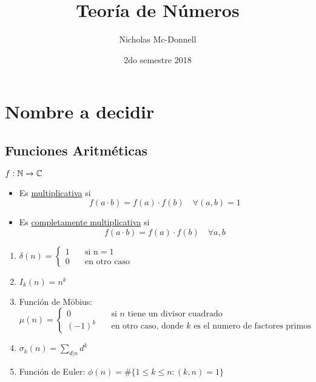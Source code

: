 

\title{Teoría de Números}
\author{Nicholas Mc-Donnell}
\date{2do semestre 2018}



\maketitle
\newpage

\tableofcontents

\newpage
\chapter{Nombre a decidir}
\section{Funciones Aritméticas}
\begin{defn}
	$f:\mathbb{N}\xrightarrow[]{}\mathbb{C}$
	\begin{itemize}
		\item Es \underline{multiplicativa} si
		      \[f(a\cdot b)=f(a)\cdot f(b)\quad \forall (a,b)=1\]

		\item Es \underline{completamente multiplicativa} si
		      \[f(a\cdot b)=f(a)\cdot f(b)\quad \forall a,b\]
	\end{itemize}
\end{defn}
\begin{ejm}
	\begin{enumerate}[label=(\alph*)]
		\item $\delta(n)=\begin{cases}
				      1 \quad & \text{si n} = 1     \\
				      0 \quad & \text{en otro caso}
			      \end{cases}$

		\item $I_k(n)=n^k$

		\item Función de Möbius:
		      \[\mu(n)=\begin{cases}
				      0      & \quad \text{si $n$ tiene un divisor cuadrado}                        \\
				      (-1)^k & \quad \text{en otro caso, donde $k$ es el numero de factores primos}
			      \end{cases}\]

		\item $\sigma_k(n)=\sum_{d|n}d^k$

		\item Función de Euler:
		      $\phi(n)=\#\{1\leq k\leq n: (k,n) =1\}$
	\end{enumerate}
\end{ejm}
